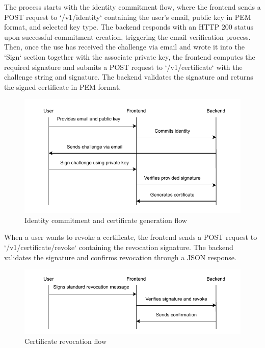 The process starts with the identity commitment flow, where the frontend sends a POST request to 
`/v1/identity` containing the user's email, public key in PEM format, and 
selected key type. The backend responds with an HTTP 200 status upon successful 
commitment creation, triggering the email verification process.
Then, once the use has received the challenge via email and wrote it into the `Sign` section
together with the associate private key, the frontend computes the required signature and submits 
a POST request to `/v1/certificate` with the challenge string and signature. 
The backend validates the signature and returns the signed certificate in PEM format.
\begin{figure}[h!]
    \centering
    \includegraphics[keepaspectratio, width=\textwidth]{Pic/create_certificate.pdf}
    \caption{Identity commitment and certificate generation flow}
    \label{fig:certificate-creation-flow}
\end{figure}
When a user wants to revoke a certificate, the frontend sends a POST request to 
`/v1/certificate/revoke` containing the revocation signature. The backend validates 
the signature and confirms revocation through a JSON response.

\begin{figure}[h!]
    \centering
    \includegraphics[keepaspectratio, width=\textwidth]{Pic/revoke_certificate.pdf}
    \caption{Certificate revocation flow}
    \label{fig:certificate-revocation-flow}
\end{figure}

